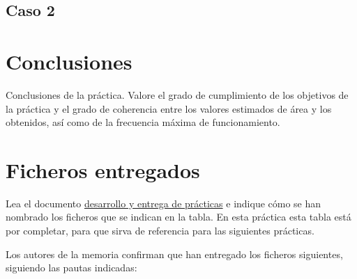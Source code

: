 \documentclass[parskip,a4paper,12pt]{article}
\begin{document}
\subsection{Caso 2}



\section{Conclusiones}
\begin{enunciado}{}{}%
Conclusiones de la práctica. Valore el grado de cumplimiento de los objetivos de la práctica y el grado de coherencia entre los valores estimados de área y los obtenidos, así como de la frecuencia máxima de funcionamiento.  
\end{enunciado}




\section{Ficheros entregados}
\begin{enunciado}{}{}%
Lea el documento \href{https://gised.webs.upv.es/pds_fpga/PDS_FPGA_practicas.pdf} {desarrollo y entrega de prácticas}  e indique cómo se han nombrado los ficheros que se indican en la tabla.  En esta práctica esta tabla está por completar, para que sirva de referencia para las siguientes prácticas.

\end{enunciado}

Los autores de la memoria confirman que han entregado los ficheros siguientes, siguiendo las pautas indicadas:

\def\colUNO{10cm}
\def\colDOS{4cm}
\end{document}

